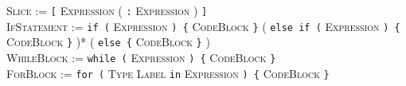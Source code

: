 \documentclass{article}
\newcommand{\code}[1]{\colorbox{light-gray}{\texttt{#1}}}
\begin{document}
\textsc{Slice} := \code{[} \textsc{Expression} ( \code{:} \textsc{Expression} ) \code{]} \\

\textsc{IfStatement} := \code{if (} \textsc{Expression} \code{) \{} \textsc{CodeBlock} \code{\}} ( \code{else if (} \textsc{Expression} \code{) \{} \textsc{CodeBlock} \code{\}} )* ( \code{else \{} \textsc{CodeBlock} \code{\}} ) \\

\textsc{WhileBlock} := \code{while (} \textsc{Expression} \code{) \{} \textsc{CodeBlock} \code{\}} \\

\textsc{ForBlock} := \code{for (} \textsc{Type} \textsc{Label} \code{in} \textsc{Expression} \code{) \{} \textsc{CodeBlock} \code{\}}
\end{document}
